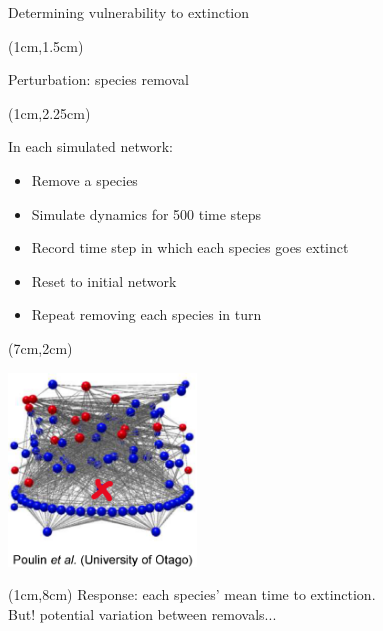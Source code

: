 \documentclass{beamer}
\begin{document}
  \begin{frame}{Determining vulnerability to extinction}

    \begin{textblock*}{7cm}(1cm,1.5cm)

      {\color{DarkBlue}Perturbation: species removal}

    \end{textblock*}

    \begin{textblock*}{5cm}(1cm,2.25cm)

      {\color{DarkBlue}In each simulated network:}

      \begin{itemize}
        \item Remove a species
        \item Simulate dynamics for 500 time steps
        \item Record time step in which each species goes extinct
        \item Reset to initial network
        \item Repeat removing each species in turn

      \end{itemize}

      \end{textblock*}

    \begin{textblock*}{5cm}(7cm,2cm)

      \includegraphics[width=5cm]{intro_figs/Otagoweb_remove2.eps}

      \end{textblock*}

    \begin{textblock*}{10cm}(1cm,8cm)
      {\color{DarkBlue} Response: each species' mean time to extinction.\\
      But! potential variation between removals...}
      \end{textblock*}

    \end{frame}
\end{document}
